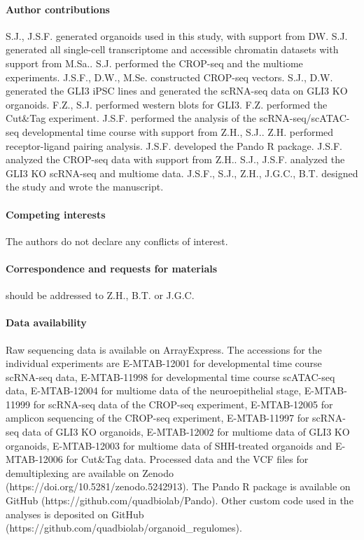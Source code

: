 \paragraph{Author contributions} S.J., J.S.F. generated organoids used in this study, with support from DW.  S.J. generated all single-cell transcriptome and accessible chromatin datasets with support from M.Sa..  S.J. performed the CROP-seq and the multiome experiments. J.S.F., D.W., M.Se. constructed CROP-seq vectors. S.J., D.W. generated the GLI3 iPSC lines and generated the scRNA-seq data on GLI3 KO organoids. F.Z., S.J. performed western blots for GLI3. F.Z. performed the Cut\&Tag experiment. J.S.F. performed the analysis of the scRNA-seq/scATAC-seq developmental time course with support from Z.H., S.J.. Z.H. performed receptor-ligand pairing analysis. J.S.F. developed the Pando R package. J.S.F. analyzed the CROP-seq data with support from Z.H.. S.J., J.S.F. analyzed the GLI3 KO scRNA-seq and multiome data.  J.S.F., S.J., Z.H., J.G.C., B.T. designed the study and wrote the manuscript.
 
\paragraph{Competing interests} The authors do not declare any conflicts of interest.

\paragraph{Correspondence and requests for materials} should be addressed to Z.H., B.T. or J.G.C.
 
\paragraph{Data availability} Raw sequencing data is available on ArrayExpress. The accessions for the individual experiments are E-MTAB-12001 for developmental time course scRNA-seq data, E-MTAB-11998 for developmental time course scATAC-seq data, E-MTAB-12004 for multiome data of the neuroepithelial stage, E-MTAB-11999 for scRNA-seq data of the CROP-seq experiment, E-MTAB-12005 for amplicon sequencing of the CROP-seq experiment, E-MTAB-11997 for scRNA-seq data of GLI3 KO organoids, E-MTAB-12002 for multiome data of GLI3 KO organoids, E-MTAB-12003 for multiome data of SHH-treated organoids and E-MTAB-12006 for Cut\&Tag data. Processed data and the VCF files for demultiplexing are available on Zenodo (https://doi.org/10.5281/zenodo.5242913). The Pando R package is available on GitHub (https://github.com/quadbiolab/Pando). Other custom code used in the analyses is deposited on GitHub (https://github.com/quadbiolab/organoid\_regulomes).
 
